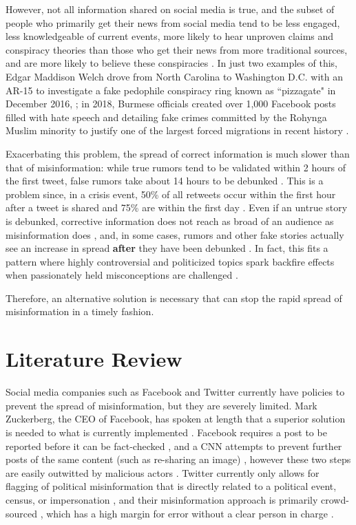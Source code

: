 \documentclass[preprint,12pt]{elsarticle}
\begin{document}
However, not all information shared on social media is true, and the subset of people who primarily get their news from social media tend to be less engaged, less knowledgeable of current events, more likely to hear unproven claims and conspiracy theories than those who get their news from more traditional sources, and are more likely to believe these conspiracies \cite{mitchell2020americans}. In just two examples of this, Edgar Maddison Welch drove from North Carolina to Washington D.C. with an AR-15 to investigate a fake pedophile conspiracy ring known as ``pizzagate" in December 2016, \cite{goldman2016comet}; in 2018, Burmese officials created over 1,000 Facebook posts filled with hate speech and detailing fake crimes committed by the Rohynga Muslim minority to justify one of the largest forced migrations in recent history \cite{subedar2018country}.

Exacerbating this problem, the spread of correct information is much slower than that of misinformation: while true rumors tend to be validated within 2 hours of the first tweet, false rumors take about 14 hours to be debunked \cite{zubiaga2016analysing,shao2016hoaxy}. This is a problem since, in a crisis event, 50\% of all retweets occur within the first hour after a tweet is shared and 75\% are within the first day \cite{kwak2010twitter}. Even if an untrue story is debunked, corrective information does not reach as broad of an audience as misinformation does \cite{maddock2015characterizing, vosoughi2018spread}, and, in some cases, rumors and other fake stories actually see an increase in spread \textbf{after} they have been debunked \cite{starbird2014rumors}. In fact, this fits a pattern where highly controversial and politicized topics spark backfire effects when passionately held misconceptions are challenged \cite{gollust2009polarizing,nyhan2010corrections,nyhan2013hazards,redlawsk2010affective,schaffner2016misinformation,hart2012boomerang}.

Therefore, an alternative solution is necessary that can stop the rapid spread of misinformation in a timely fashion. 

\section{Literature Review}
Social media companies such as Facebook and Twitter currently have policies to prevent the spread of misinformation, but they are severely limited. Mark Zuckerberg, the CEO of Facebook, has spoken at length that a superior solution is needed to what is currently implemented \citep{energy2018facebook,zuckerberg2020}. Facebook requires a post to be reported before it can be fact-checked \citep{owen2016clamping}, and a CNN attempts to prevent further posts of the same content (such as re-sharing an image) \citep{carion2020end}, however these two steps are easily outwitted by malicious actors \citep{sumbaly2020using,dean2020facebook,Fung2020facebook}. Twitter currently only allows for flagging of political misinformation that is directly related to a political event, census, or impersonation \citep{twitter2021rules}, and their misinformation approach is primarily crowd-sourced \cite{birdwatch2021twitter}, which has a high margin for error without a clear person in charge \cite{hara2016co}.
\end{document}
